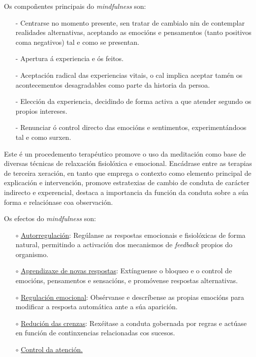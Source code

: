 \documentclass[a4paper,11pt]{article}
\begin{document}
Os compoñentes principais do \textit{mindfulness} son:
\begin{itemize}
	\item[-] Centrarse no momento presente, sen tratar de cambialo nin de contemplar realidades 
	alternativas, aceptando as emocións e pensamentos (tanto positivos coma negativos) tal e como se 
	presentan.
	\item[-] Apertura á experiencia e ós feitos.
	\item[-] Aceptación radical das experiencias vitais, o cal implica aceptar tamén os 
	acontecementos desagradables como parte da historia da persoa.
	\item[-] Elección da experiencia, decidindo de forma activa a que atender segundo os propios 
	intereses.
	\item[-] Renunciar ó control directo das emocións e sentimentos, experimentándoos tal e como 
	surxen.
\end{itemize}

Este é un procedemento terapéutico promove o uso da meditación como base de diversas técnicas de relaxación fisiolóxica e emocional. Encádrase entre as terapias de terceira xeración, en tanto que emprega o contexto como elemento principal de explicación e intervención, promove estratexias de cambio de conduta de carácter indirecto e experencial, destaca a importancia da función da conduta sobre a súa forma e relaciónase coa observación.

Os efectos do \textit{mindfulness} son:
\begin{itemize}
	\item[$\circ$] \underline{Autorregulación}: Regúlanse as respostas emocionais e fisiolóxicas de 
	forma natural, permitindo a activación dos mecanismos de \textit{feedback} propios do organismo.
	\item[$\circ$] \underline{Aprendizaxe de novas respostas}: Extínguense o bloqueo e o control de 
	emocións, pensamentos e sensacións, e promóvense respostas alternativas.
	\item[$\circ$] \underline{Regulación emocional}: Obsérvanse e descríbense as propias emocións 
	para modificar a resposta automática ante a súa aparición.
	\item[$\circ$] \underline{Redución das crenzas}: Rexéitase a conduta gobernada por regras e 
	actúase en función de continxencias relacionadas cos sucesos.
	\item[$\circ$] \underline{Control da atención.}
\end{itemize}
\end{document}

